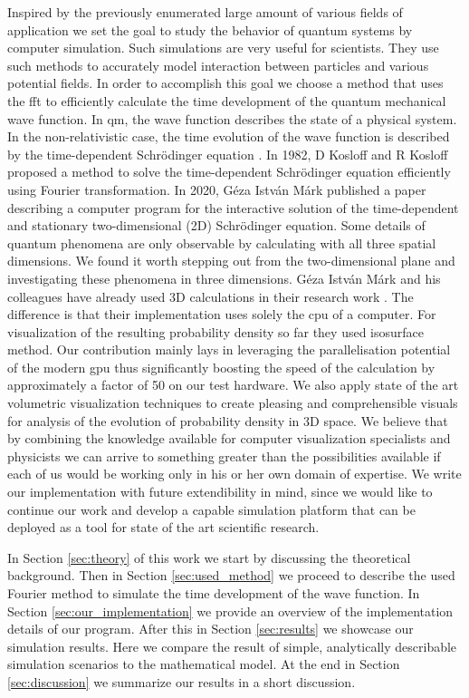 Inspired by the previously enumerated large amount of various fields of application we set the goal to study the behavior of quantum systems by computer simulation.
Such simulations are very useful for scientists. They use such methods to accurately model interaction between particles and various potential fields.
In order to accomplish this goal we choose a method that uses the \acrfull{fft} to efficiently calculate the time development of the quantum mechanical wave function.
In \acrshort{qm}, the wave function describes the state of a physical system. In the non-relativistic case, the time evolution of the wave function is described by the time-dependent Schrödinger equation \cite{schrodinger1926}.
In 1982, D Kosloff and R Kosloff proposed a method \cite{KOSLOFF198335} to solve the time-dependent Schrödinger equation efficiently using Fourier transformation.
In 2020, Géza István Márk published a paper \cite{mark2020webschrodinger} describing a computer program for the interactive solution of the time-dependent and stationary two-dimensional (2D) Schrödinger equation.
Some details of quantum phenomena are only observable by calculating with all three spatial dimensions.
We found it worth stepping out from the two-dimensional plane and investigating these phenomena in three dimensions.
Géza István Márk and his colleagues have already used 3D calculations in their research work \cite{VANCSO2013101, Mark2016}.
The difference is that their implementation uses solely the \acrfull{cpu} of a computer.
For visualization of the resulting probability density so far they used isosurface method.
Our contribution mainly lays in leveraging the parallelisation potential of the modern \acrfull{gpu} thus significantly boosting the speed of the calculation by approximately a factor of 50 on our test hardware.
We also apply state of the art volumetric visualization techniques to create pleasing and comprehensible visuals for analysis of the evolution of probability density in 3D space.
We believe that by combining the knowledge available for computer visualization specialists and physicists we can arrive to something greater than the possibilities available if each of us would be working only in his or her own domain of expertise.
We write our implementation with future extendibility in mind, since we would like to continue our work and develop a capable simulation platform that can be deployed as a tool for state of the art scientific research.

In Section \ref{sec:theory} of this work we start by discussing the theoretical background.
Then in Section \ref{sec:used_method} we proceed to describe the used Fourier method to simulate the time development of the wave function.
In Section \ref{sec:our_implementation} we provide an overview of the implementation details of our program.
After this in Section \ref{sec:results} we showcase our simulation results.
Here we compare the result of simple, analytically describable simulation scenarios to the mathematical model.
At the end in Section \ref{sec:discussion} we summarize our results in a short discussion.



